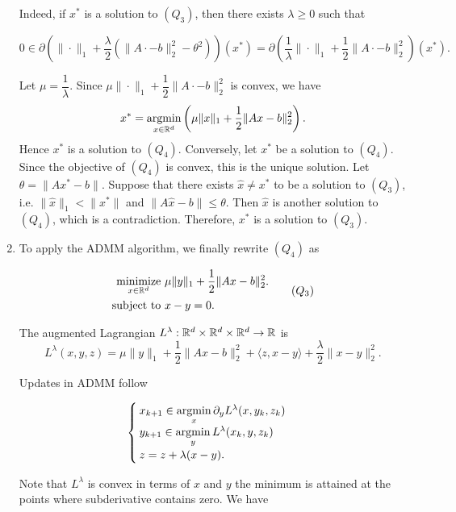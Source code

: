 \begin{enumerate}
        Indeed, if $x^*$ is a solution to $(Q_3)$, then there exists $\lambda \ge 0$ such that

        $$0\in \partial\left(\|\cdot\|_1 + \dfrac{\lambda}{2}(\|A\cdot - b\|_2^2 - \theta^2)\right)(x^*) = \partial\left(\dfrac{1}{\lambda}\|\cdot\|_1 + \dfrac{1}{2}\|A\cdot - b\|_2^2\right)(x^*).$$

        Let $\mu = \dfrac{1}{\lambda}$. Since $\mu\|\cdot\|_1 + \dfrac{1}{2}\|A\cdot - b\|_2^2$ is convex, we have
        $$x^* = \operatorname*{argmin}\limits_{x\in{\mathbb{R}}^d}\left(\mu\|x\|_1 + \dfrac{1}{2}\|Ax - b\|_2^2\right).$$
        Hence $x^*$ is a solution to $(Q_4)$. Conversely, let $x^*$ be a solution to $(Q_4)$. Since the objective of $(Q_4)$ is convex, this is the unique solution. Let $\theta = \|Ax^* - b\|$. Suppose that there exists $\hat{x} \ne x^*$ to be a solution to $(Q_3)$, i.e. $\|\hat{x}\|_1 < \|x^*\|$ and $\|A\hat{x} - b\| \le \theta$. Then $\hat{x}$ is another solution to $(Q_4)$, which is a contradiction. Therefore, $x^*$ is a solution to $(Q_3)$.
  \item To apply the ADMM algorithm, we finally rewrite $(Q_4)$ as

        \begin{equation}
          \begin{aligned}
            \operatorname*{minimize}\limits_{x\in{\mathbb{R}}^d} & \,\,\mu\|y\|_1 + \dfrac{1}{2} \|Ax - b\|_2 ^2. \\
            \mathrm{subject \,\, to}     & \,\, x - y = 0.
          \end{aligned}
          \tag{$Q_3$}
        \end{equation}

        The augmented Lagrangian $L^\lambda : {\mathbb{R}}^d \times {\mathbb{R}}^d \times {\mathbb{R}}^d \to {\mathbb{R}}$ is
        $$L^\lambda(x,y,z) = \mu\|y\|_1 + \dfrac{1}{2} \|Ax - b\|_2 ^2 + \langle z, x-y\rangle + \dfrac{\lambda}{2}\|x-y\|_2^2.$$

        Updates in ADMM follow

        $$\begin{cases}
            x_{k+1} \in \operatorname*{argmin}\limits_{x}\partial_y L^\lambda(x, y_k, z_k) \\
            y_{k+1} \in \operatorname*{argmin}\limits_{y} L^\lambda(x_k, y, z_k)           \\
            z = z + \lambda(x-y).
          \end{cases}$$

        Note that $L^\lambda$ is convex in terms of $x$ and $y$ the minimum is attained at the points where subderivative contains zero. We have


\end{enumerate}
